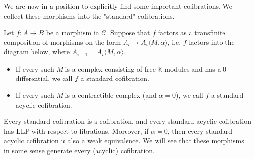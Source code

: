 \documentclass[../thesis.tex]{subfiles}
\begin{document}
            We are now in a position to explicitly find some important cofibrations. We collect these morphisms into the "standard" cofibrations.

            \begin{definition}
                Let $f:A\rightarrow B$ be a morphism in $\mathcal{C}$. Suppose that $f$ factors as a transfinite composition of morphisms on the form $A_i \rightarrow A_i\langle M,\alpha\rangle$, i.e. $f$ factors into the diagram below, where $A_{i+1} = A_i\langle M,\alpha\rangle$.
                \begin{center}
                \end{center}
                \begin{itemize}
                    \item If every such $M$ is a complex consisting of free $\mathbb{K}$-modules and has a $0$-differential, we call $f$ a standard cofibration.
                    \item If every such $M$ is a contractible complex (and $\alpha = 0$), we call $f$ a standard acyclic cofibration.
                \end{itemize}
            \end{definition}

            \begin{proposition}
                Every standard cofibration is a cofibration, and every standard acyclic cofibration has LLP with respect to fibrations. Moreover, if $\alpha = 0$, then every standard acyclic cofibration is also a weak equivalence. We will see that these morphisms in some sense generate every (acyclic) cofibration.
            \end{proposition}
\end{document}
